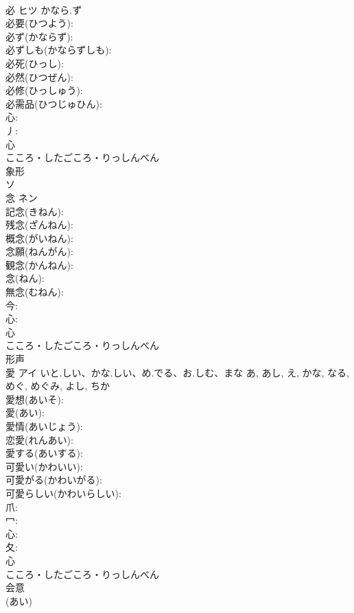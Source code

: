 \documentclass[8pt]{extreport}
\begin{document}
\begin{CJK}{UTF8}{min}
\\	必	ヒツ	かなら.ず		
\\	必要(ひつよう): 
\\	必ず(かならず): 
\\	必ずしも(かならずしも): 
\\	必死(ひっし): 
\\	必然(ひつぜん): 
\\	必修(ひっしゅう): 
\\	必需品(ひつじゅひん): 
\\	心: 
\\	丿: 
\\	心	
\\	こころ・したごころ・りっしんべん	
\\	象形 
\\	ソ 
\\	念	ネン			
\\	記念(きねん): 
\\	残念(ざんねん): 
\\	概念(がいねん): 
\\	念願(ねんがん): 
\\	観念(かんねん): 
\\	念(ねん): 
\\	無念(むねん): 
\\	今: 
\\	心: 
\\	心	
\\	こころ・したごころ・りっしんべん	
\\	形声 
\\	愛	アイ	いと.しい、かな.しい、め.でる、お.しむ、まな	あ, あし, え, かな, なる, めぐ, めぐみ, よし, ちか	
\\	愛想(あいそ): 
\\	愛(あい): 
\\	愛情(あいじょう): 
\\	恋愛(れんあい): 
\\	愛する(あいする): 
\\	可愛い(かわいい): 
\\	可愛がる(かわいがる): 
\\	可愛らしい(かわいらしい): 
\\	爪: 
\\	冖: 
\\	心: 
\\	夂: 
\\	心	
\\	こころ・したごころ・りっしんべん	
\\	会意 
\\	(あい) 

\end{CJK}
\end{document}
